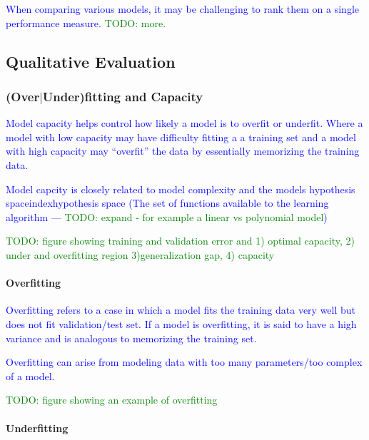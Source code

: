 \textcolor{blue}{When comparing various models, it may be challenging to rank them on a single performance measure. \textcolor{green}{TODO: more.}}

\subsection{Qualitative Evaluation}

\subsubsection{(Over$|$Under)fitting and Capacity}

\textcolor{blue}{{Model capacity} helps control how likely a model is to overfit or underfit. Where a model with low capacity may have difficulty fitting a a training set and a model with high capacity may ``overfit'' the data by essentially memorizing the training data.}

\textcolor{blue}{Model capcity is closely related to model complexity and the models {hypothesis space}index{hypothesis space} (The set of functions available to the learning algorithm --- \textcolor{green}{TODO: expand - for example a linear vs polynomial model})}

\textcolor{green}{TODO: figure showing training and validation error and 1) optimal capacity, 2) under and overfitting region 3)generalization gap, 4) capacity}

\paragraph{Overfitting}

\textcolor{blue}{Overfitting refers to a case in which a model fits the training data very well but does not fit validation/test set. If a model is overfitting, it is said to have a high variance and is analogous to memorizing the training set.}

\textcolor{blue}{Overfitting can arise from modeling data with too many parameters/too complex of a model.}

\textcolor{green}{TODO: figure showing an example of overfitting}


\paragraph{Underfitting}

